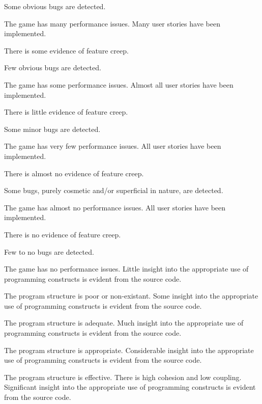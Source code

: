 \documentclass{../../fal_assignment}
\begin{document}
\begin{markingrubric}
            \par Some obvious bugs are detected.
            \par The game has many performance issues.
        \grade Many user stories have been implemented.
            \par There is some evidence of feature creep.
            \par Few obvious bugs  are detected.
            \par The game has some performance issues.
        \grade Almost all user stories have been implemented.
            \par There is little evidence of feature creep.
            \par Some minor bugs  are detected.
            \par The game has very few performance issues.
        \grade All user stories have been implemented.
            \par There is almost no evidence of feature creep.
            \par Some bugs, purely cosmetic and/or superficial in nature, are detected.
            \par The game has almost no performance issues.
        \grade All user stories have been implemented.
            \par There is no evidence of feature creep.
            \par Few to no bugs are detected.
            \par The game has no performance issues.
%
        \grade \fail Little insight into the appropriate use of programming constructs is evident from the source code.
            \par The program structure is poor or non-existant.
        \grade Some insight into the appropriate use of programming constructs is evident from the source code.
            \par The program structure is adequate.
        \grade Much insight into the appropriate use of programming constructs is evident from the source code.
            \par The program structure is appropriate.
        \grade Considerable insight into the appropriate use of programming constructs is evident from the source code.
            \par The program structure is effective. There is high cohesion and low coupling.
        \grade Significant insight into the appropriate use of programming constructs is evident from the source code.

\end{markingrubric}
\end{document}
